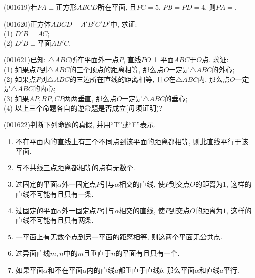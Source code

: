 \item (001619)若$PA\perp$正方形$ABCD$所在平面, 且$PC=5$, $PB=PD=4$, 则$PA=$.
\item (001620)正方体$ABCD-A'B'C'D'$中, 求证:\\ 
(1) $D'B\perp AC$;\\ 
(2) $D'B\perp$平面$AB'C$. 
\begin{center}
\end{center}
\item (001621)已知: $\triangle ABC$所在平面外一点$P$, 直线$PO\perp$平面$ABC$于$O$点. 求证:\\ 
(1) 如果点$P$到$\triangle ABC$的三个顶点的距离相等, 那么点$O$一定是$\triangle ABC$的外心;\\ 
(2) 如果点$P$到$\triangle ABC$的三边所在直线的距离相等, 且$O$在$\triangle ABC$内, 那么点$O$一定是$\triangle ABC$的内心;\\ 
(3) 如果$AP,BP,CP$两两垂直, 那么点$O$一定是$\triangle ABC$的垂心;\\ 
(4) 以上三个命题各自的逆命题是否成立(毋须证明)?
\item (001622)判断下列命题的真假, 并用``{\rm T}''或``{\rm F}''表示.\\ 
\begin{enumerate}[\blank{30}(1)]
\item 不在平面内的直线上有三个不同点到该平面的距离都相等, 则此直线平行于该平面.\\ 
\item 与不共线三点距离都相等的点有无数个.\\ 
\item 过固定的平面$\alpha$外一固定点$P$引与$\alpha$相交的直线, 使$P$到交点$O$的距离为$1$, 这样的直线不可能有且只有一条.\\ 
\item 过固定的平面$\alpha$外一固定点$P$引与$\alpha$相交的直线, 使$P$到交点$O$的距离为$1$, 这样的直线不可能有且只有两条.\\ 
\item 一平面上有无数个点到另一平面的距离相等, 则这两个平面无公共点.\\ 
\item 过异面直线$m,n$中的$m$且垂直于$n$的平面有且只有一个.\\ 
\item 如果平面$\alpha$和不在平面$\alpha$内的直线$a$都垂直于直线$b$, 那么平面$\alpha$和直线$a$平行.\\ 
\end{enumerate}
